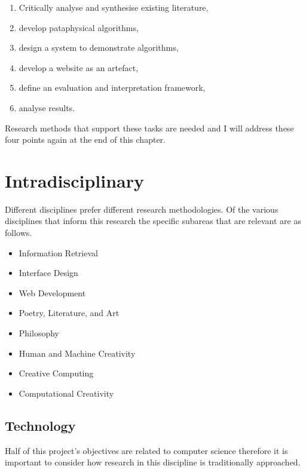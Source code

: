 \label{s:objectives}
\begin{enumerate}
  \item Critically analyse and synthesise existing literature,\marginpar{\textspiral~\ref{p:lit}}
  \item develop pataphysical algorithms,\marginpar{\textspiral~\ref{p:practice}}
  \item design a system to demonstrate algorithms,\marginpar{\textspiral~\ref{p:practice}}
  \item develop a website as an artefact,\marginpar{\textspiral~\ref{p:practice}}
  \item define an evaluation and interpretation framework,\marginpar{\textspiral~\ref{p:theory}}
  \item analyse results.\marginpar{\textspiral~\ref{p:analysis}}
\end{enumerate}

Research methods that support these tasks are needed and I will address these four points again at the end of this chapter.


\section{Intradisciplinary}

Different disciplines prefer different research methodologies. Of the various disciplines that inform this research the specific subareas that are relevant are as follows.

\begin{itemize}
  \item Information Retrieval
  \item Interface Design
  \item Web Development
  \item Poetry, Literature, and Art
  \item Philosophy
  \item Human and Machine Creativity
  \item Creative Computing
  \item Computational Creativity
\end{itemize}


\subsection{Technology}

Half of this project's objectives are related to computer science therefore it is important to consider how research in this discipline is traditionally approached.

